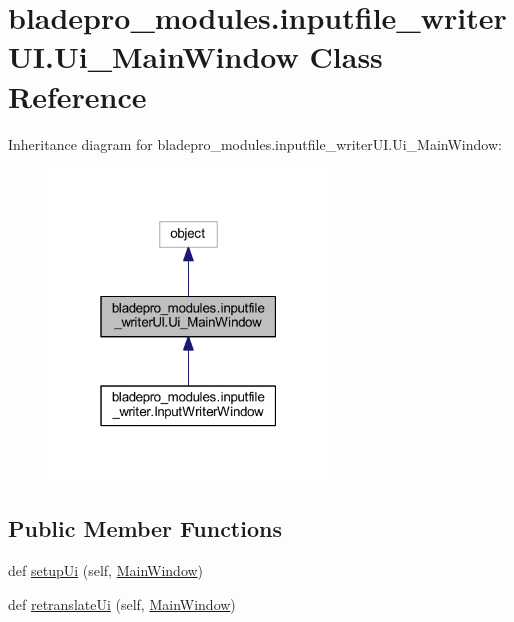 \hypertarget{classbladepro__modules_1_1inputfile__writer_u_i_1_1_ui___main_window}{}\section{bladepro\+\_\+modules.\+inputfile\+\_\+writer\+U\+I.\+Ui\+\_\+\+Main\+Window Class Reference}
\label{classbladepro__modules_1_1inputfile__writer_u_i_1_1_ui___main_window}


Inheritance diagram for bladepro\+\_\+modules.\+inputfile\+\_\+writer\+U\+I.\+Ui\+\_\+\+Main\+Window\+:\nopagebreak
\begin{figure}[H]
\begin{center}
\leavevmode
\includegraphics[width=211pt]{classbladepro__modules_1_1inputfile__writer_u_i_1_1_ui___main_window__inherit__graph}
\end{center}
\end{figure}
\subsection*{Public Member Functions}
\begin{DoxyCompactItemize}
\item 
def \hyperlink{classbladepro__modules_1_1inputfile__writer_u_i_1_1_ui___main_window_a77688f6f653ba2711e93269a03753754}{setup\+Ui} (self, \hyperlink{namespacebladepro__modules_1_1inputfile__writer_u_i_ab649489a40967421c06970ba9ffeef53}{Main\+Window})
\item 
def \hyperlink{classbladepro__modules_1_1inputfile__writer_u_i_1_1_ui___main_window_a640f34d5228b66fcf4118eaa17edf8d6}{retranslate\+Ui} (self, \hyperlink{namespacebladepro__modules_1_1inputfile__writer_u_i_ab649489a40967421c06970ba9ffeef53}{Main\+Window})
\end{DoxyCompactItemize}
